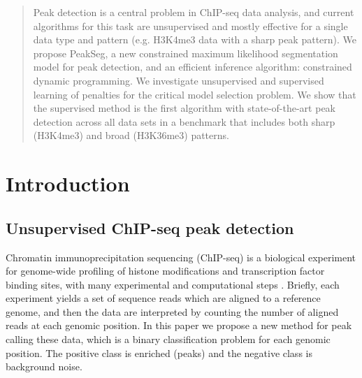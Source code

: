 \documentclass{article}
\begin{document}

\begin{abstract}
  Peak detection is a central problem in ChIP-seq data analysis, and
  current algorithms for this task are unsupervised and mostly
  effective for a single data type and pattern (e.g. H3K4me3 data with
  a sharp peak pattern). We propose PeakSeg, a new constrained maximum
  likelihood segmentation model for peak detection, and an efficient
  inference algorithm: constrained dynamic programming. We investigate
  un\-super\-vised and super\-vised learning of penalties for
  the critical model selection problem. We show that the 
  super\-vised method is the first algorithm with state-of-the-art peak
  detection across all data sets in a benchmark that includes both
  sharp (H3K4me3) and broad (H3K36me3) patterns.
\end{abstract}

\section{Introduction}

\subsection{Unsupervised ChIP-seq peak detection}

Chromatin immunoprecipitation sequencing (ChIP-seq) is a biological
experiment for genome-wide profiling of histone modifications and
transcription factor binding sites, with many experimental and
computational steps \citep{practical}. Briefly, each experiment yields
a set of sequence reads which are aligned to a reference genome, and
then the data are interpreted by counting the number of aligned reads
at each genomic position. In this paper we propose a new method for
peak calling these data, which is a binary classification problem for
each genomic position. The positive class is enriched (peaks) and the
negative class is background noise.
\end{document}
